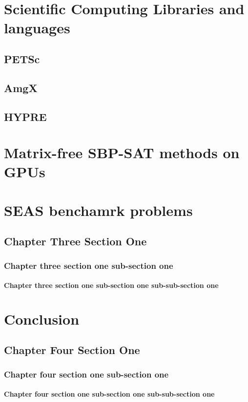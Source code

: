 \chapter{Scientific Computing Libraries and languages}
\section{PETSc}

\section{AmgX}

\section{HYPRE}





\chapter{Matrix-free SBP-SAT methods on GPUs}




\chapter{SEAS benchamrk problems}
\section{Chapter Three Section One}
\subsection{Chapter three section one sub-section one}
\subsubsection{Chapter three section one sub-section one sub-sub-section one}


\chapter{Conclusion}
\section{Chapter Four Section One}
\subsection{Chapter four section one sub-section one}
\subsubsection{Chapter four section one sub-section one sub-sub-section one}

